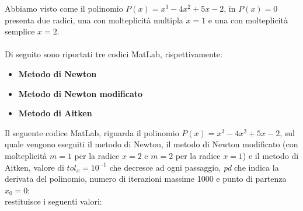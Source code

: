 Abbiamo visto come il polinomio $P(x) = x^3-4x^2+5x-2$, in $P(x)=0$ presenta due radici, una con molteplicità multipla $x=1$ e una con molteplicità semplice $x=2$.\\\\
Di seguito sono riportati tre codici MatLab, rispettivamente:
\begin{itemize}
\item \textbf{Metodo di Newton}

\item \textbf{Metodo di Newton modificato}

\item \textbf{Metodo di Aitken}

\end{itemize}
Il seguente codice MatLab, riguarda il polinomio $P(x) = x^3-4x^2+5x-2$, sul quale vengono eseguiti il metodo di Newton, il metodo di Newton modificato (con molteplicità $m=1$ per la radice $x=2$ e $m=2$ per la radice $x=1$) e il metodo di Aitken, valore di $tol_x=10^{-1}$ che decresce ad ogni passaggio, \textit{pd} che indica la derivata del polinomio, numero di iterazioni massime 1000 e punto di partenza $x_{0}=0$:\\

restituisce i seguenti valori:\\

